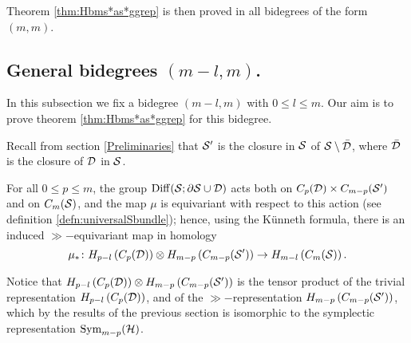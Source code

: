 Theorem \ref{thm:Hbms*as*ggrep} is then proved in all bidegrees of the form $(m,m)$.

\subsection{General bidegrees $(m-l,m)$.} In this subsection we fix a bidegree $(m-l,m)$
with $0\leq l\leq m$.
Our aim is to prove theorem \ref{thm:Hbms*as*ggrep} for this bidegree.


%  
%  
% 
Recall from section \ref{Preliminaries} that $\S'$ is the closure in $\S$ of
$\S\setminus\bar\D$, where $\bar\D$ is the closure of $\D$ in $\S$.

For all $0\leq p\leq m$, the group $\Diff(\S;\partial\S\cup\D)$ acts both on $C_p(\D)\times C_{m-p}(\S')$
and on $\cms$, and the map $\mu$ is equivariant with respect to this action
(see definition \ref{defn:universalSbundle});
hence, using the K\"{u}nneth formula, there is an induced $\gg-$equivariant map in homology
\begin{equation}
 \label{eq:mu*}
 \mu_*\colon H_{p-l}\pa{C_p(\D)}\otimes H_{m-p}\pa{C_{m-p}(\S')}\to H_{m-l}\pa{\cms}.
\end{equation}

Notice that $H_{p-l}\pa{C_p(\D)}\otimes H_{m-p}\pa{C_{m-p}(\S')}$
is the tensor product of the trivial representation $H_{p-l}\pa{C_p(\D)}$, and
of the $\gg-$representation $H_{m-p}\pa{C_{m-p}(\S')}$, which by the results of the previous
section is isomorphic to the symplectic representation $\Sym_{m-p}(\H)$.

